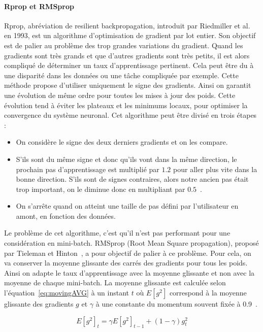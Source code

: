 \paragraph{Rprop et RMSprop}
Rprop, abréviation de resilient backpropagation, introduit par Riedmiller et al.~\cite{Riedmiller1993} en 1993, est un algorithme d'optimisation de gradient par lot entier. Son objectif est de palier au problème des trop grandes variations du gradient. Quand les gradients sont très grands et que d'autres gradients sont très petits, il est alors compliqué de déterminer un taux d'apprentissage pertinent. Cela peut être du à une disparité dans les données ou une tâche compliquée par exemple. Cette méthode propose d'utiliser uniquement le signe des gradients. Ainsi on garantit une évolution de même ordre pour toutes les mises à jour des poids. Cette évolution tend à éviter les plateaux et les minimums locaux, pour optimiser la convergence du système neuronal. Cet algorithme peut être divisé en trois étapes :
\begin{itemize}
  \item On considère le signe des deux derniers gradients et on les compare.
  \item S'ils sont du même signe et donc qu'ils vont dans la même direction, le prochain pas d'apprentissage est multiplié par $1.2$ pour aller plus vite dans la bonne direction. S'ils sont de signes contraires, alors notre ancien pas était trop important, on le diminue donc en multipliant par $0.5$~\cite{Riedmiller1993}.
  \item On s'arrête quand on atteint une taille de pas défini par l'utilisateur en amont, en fonction des données.
\end{itemize}

Le problème de cet algorithme, c'est qu'il n'est pas performant pour une considération en mini-batch. RMSprop (Root Mean Square propagation), proposé par Tieleman et Hinton~\cite{Tieleman2012}, a pour objectif de palier à ce problème. Pour cela, on va conserver la moyenne glissante des carrés des gradients pour tous les poids. Ainsi on adapte le taux d'apprentissage avec la moyenne glissante et non avec la moyenne de chaque mini-batch. La moyenne glissante est calculée selon l'équation~\ref{eq:movingAVG} à un instant $t$ où $E[g^{2}]$ correspond à la moyenne glissante des gradients $g$ et $\gamma$ à une constante du momentum souvent fixée à 0.9~\cite{Tieleman2012}.

\begin{equation}
  E\left[g^{2}\right]_{t} = \gamma E\left[g^{2}\right]_{t-1} + \left(1 - \gamma\right) g^{2}_{t}
  \label{eq:movingAVG}
\end{equation}

